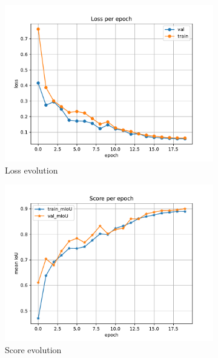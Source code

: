 \documentclass[10pt, a4paper]{article}
\begin{document}
\begin{figure}[htpb]
  \centering
  \begin{subfigure}[b]{0.32\textwidth}
      \centering
      \includegraphics[width=\textwidth]{images/Patch128_imagenet_loss.pdf}
      \caption{Loss evolution}
      \label{fig:q1c_loss}
  \end{subfigure}
  \hfill
  \begin{subfigure}[b]{0.32\textwidth}
    \centering
    \includegraphics[width=\textwidth]{images/Patch128_imagenet_score.pdf}
    \caption{Score evolution}
    \label{fig:q1c_score}
  \end{subfigure}
  \hfill
  \begin{subfigure}[b]{0.32\textwidth}

\end{subfigure}
\end{figure}
\end{document}
